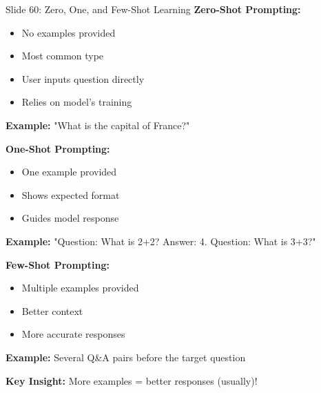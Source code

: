 \documentclass[8pt]{beamer}
\begin{document}
	\begin{frame}{Slide 60: Zero, One, and Few-Shot Learning}
		\fontsize{6.5}{7.5}\selectfont
		\textbf{Zero-Shot Prompting:}
		\begin{itemize}
			\item No examples provided
			\item Most common type
			\item User inputs question directly
			\item Relies on model's training
		\end{itemize}
		\textbf{Example:} "What is the capital of France?"
		
		\vspace{0.1cm}
		\textbf{One-Shot Prompting:}
		\begin{itemize}
			\item One example provided
			\item Shows expected format
			\item Guides model response
		\end{itemize}
		\textbf{Example:} "Question: What is 2+2? Answer: 4. Question: What is 3+3?"
		
		\vspace{0.1cm}
		\textbf{Few-Shot Prompting:}
		\begin{itemize}
			\item Multiple examples provided
			\item Better context
			\item More accurate responses
		\end{itemize}
		\textbf{Example:} Several Q\&A pairs before the target question
		
		\textcolor{myblue}{\textbf{Key Insight:}} More examples = better responses (usually)!
	\end{frame}
	
\end{document}
